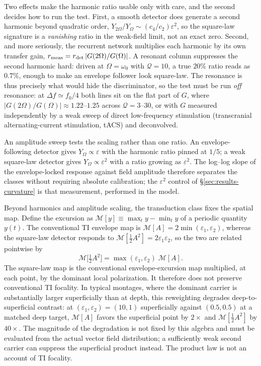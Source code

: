 \documentclass[11pt,a4paper]{article}
\newcommand{\half}{\tfrac{1}{2}}
\providecommand{\DIFdeltex}[1]{{\protect\color{red} \scriptsize #1}} %
\providecommand{\DIFdelbegin}{} %
\providecommand{\DIFdelend}{} %
\providecommand{\DIFdel}[1]{\texorpdfstring{\DIFdeltex{#1}}{}} %
\begin{document}
Two effects make the harmonic ratio usable only with care, and the second decides how to
run the test. First, a smooth detector does generate a second harmonic beyond quadratic
order, $Y_{2\Omega}/Y_\Omega\sim(c_4/c_2)\varepsilon^2$, so the square-law signature is a
\emph{vanishing} ratio in the weak-field limit, not an exact zero. Second, and more
seriously, the recurrent network multiplies each harmonic by its own transfer gain,
$r_{\rm meas}=r_{\rm det}\,|G(2\Omega)/G(\Omega)|$. A resonant column suppresses the second
harmonic hard: driven at $\Omega=\omega_0$ with $\mathcal{Q}=10$, a true $20\%$ ratio reads
as $0.7\%$, enough to make an envelope follower look square-law. The resonance is thus
\DIFdelbegin \DIFdel{precisely }\DIFdelend what would hide the discriminator, so the test must be run \emph{off} resonance:
at $\Delta f\simeq f_0/4$ both lines sit on the flat part of $G$, where
$|G(2\Omega)/G(\Omega)|\approx1.22$--$1.25$ across $\mathcal{Q}=3$--$30$, or with $G$
measured independently by a weak sweep of direct low-frequency stimulation (transcranial
alternating-current stimulation, tACS) and deconvolved.

An amplitude sweep tests the scaling rather than one ratio. An
envelope-following detector gives $Y_\Omega\propto\varepsilon$ with the harmonic ratio
pinned at $1/5$; a weak square-law detector gives $Y_\Omega\propto\varepsilon^2$ with a
ratio growing as $\varepsilon^2$. The log--log slope of the envelope-locked response
against field amplitude therefore separates the classes without requiring absolute
calibration; the $\varepsilon^2$ control of \S\ref{sec:results-curvature} is that
measurement, performed in the model.

Beyond harmonics and amplitude scaling, the transduction class fixes the spatial map.
Define the excursion as
$\mathcal{M}[y]\equiv\max_t y-\min_t y$ of a periodic quantity $y(t)$. The conventional TI envelope map is
$\mathcal{M}[A]=2\min(\varepsilon_1,\varepsilon_2)$, whereas the square-law detector
responds to $\mathcal{M}[\half A^2]=2\varepsilon_1\varepsilon_2$, so the two are related
pointwise by
\begin{equation}
\mathcal{M}\big[\tfrac12A^2\big]=\max(\varepsilon_1,\varepsilon_2)\;\mathcal{M}[A].
\label{eq:reweight}
\end{equation}
The square-law map is the conventional envelope-excursion map multiplied, at each point,
by the dominant local polarization. It therefore does not preserve conventional TI
focality. In typical montages, where the dominant carrier is substantially larger
superficially than at depth, this reweighting degrades deep-to-superficial contrast: at
$(\varepsilon_1,\varepsilon_2)=(10,1)$ superficially against $(0.5,0.5)$ at a matched
deep target, $\mathcal{M}[A]$ favors the superficial point by $2\times$ and
$\mathcal{M}[\half A^2]$ by $40\times$. The magnitude of the degradation is not fixed by
this algebra and must be evaluated from the actual vector field distribution; a
sufficiently weak second carrier can suppress the superficial product instead. The
product law is not an account of TI focality.
\end{document}
